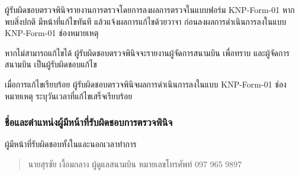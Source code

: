 ผู้รับผิดชอบตรวจพินิจรายงานการตรวจโดยการลงผลการตรวจในแบบฟอร์ม KNP-Form-01 หากพบสิ่งปกติ มีหน้าที่แก้ไขทันที   แล้วแจ้งผลการแก้ไขด้วยวาจา ก่อนลงผลการดำเนินการลงในแบบ KNP-Form-01 ช่องหมายเหตุ

หากไม่สามารถแก้ไขได้  ผู้รับผิดชอบตรวจพินิจจะรายงานผู้จัดการสนามบิน เพื่อทราบ และผู้จัดการสนามบิน เป็นผู้รับผิดชอบแก้ไข

เมื่อการแก้ไขเรียบร้อย ผู้รับผิดชอบตรวจพินิจผลการดำเนินการลงในแบบ KNP-Form-01 ช่องหมายเหตุ ระบุวันเวลาที่แก้ไขเสร็จเรียบร้อย

\subsubsection{ชื่อและตำแหน่งผู้มีหน้าที่รับผิดชอบการตรวจพินิจ }

ผู้มีหน้าที่รับผิดชอบทั้งในและนอกเวลาทำการ 
\begin{quote}
	 นายสุรชัย เงื้อมกลาง ผู้ดูแลสนามบิน หมายเลขโทรศัพท์ 097 965 9897
\end{quote}

